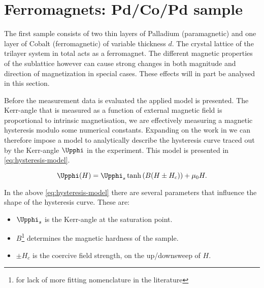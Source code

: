 
\section{Ferromagnets: Pd/Co/Pd sample}
\label{sec:ferromagnet}

The first sample consists of two thin layers of Palladium (paramagnetic) and one
layer of Cobalt (ferromagnetic) of variable thickness $d$. The crystal lattice of the
trilayer system in total acts as a ferromagnet. The different magnetic properties of 
the sublattice however can cause strong changes in both magnitude and direction of
magnetization in special cases. These effects will in part be analysed in this 
section.

Before the measurement data is evaluated the applied model is presented. The 
Kerr-angle that is measured as a function of external magnetic field is proportional
to intrinsic magnetisation, we are effectively measuring a magnetic hysteresis modulo
some numerical constants. Expanding on the work in \cite{article} we can therefore 
impose a model to analytically describe the hysteresis curve traced out by the
Kerr-angle $\Upphi$ in the experiment. This model is presented in 
\autoref{eq:hysteresis-model}.

\begin{equation}
\label{eq:hysteresis-model}
\Upphi(H) = \Upphi_s \tanh\left( B ( H \pm H_c ) \right) + \mu_0 H.
\end{equation}

In the above \autoref{eq:hysteresis-model} there are several parameters that 
influence the shape of the hysteresis curve. These are:

\begin{itemize}
\item $\Upphi_s$ is the Kerr-angle at the saturation point. 
\item $B$\footnote{for lack of more fitting nomenclature in the literature} 
determines the magnetic hardness of the sample.
\item $\pm H_c$ is the coercive field strength, on the up/downsweep of $H$.
\end{itemize}


